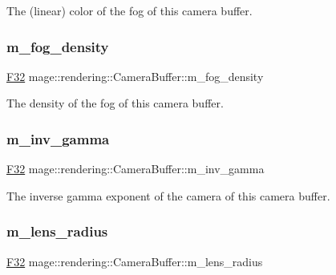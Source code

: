 The (linear) color of the fog of this camera buffer. \hypertarget{structmage_1_1rendering_1_1_camera_buffer_aa9c3a305adfbeb717d480e822ed1c77e}{}\label{structmage_1_1rendering_1_1_camera_buffer_aa9c3a305adfbeb717d480e822ed1c77e} 
\subsubsection{\texorpdfstring{m\+\_\+fog\+\_\+density}{m\_fog\_density}}
{\footnotesize\ttfamily \hyperlink{namespacemage_aa97e833b45f06d60a0a9c4fc22ae02c0}{F32} mage\+::rendering\+::\+Camera\+Buffer\+::m\+\_\+fog\+\_\+density}

The density of the fog of this camera buffer. \hypertarget{structmage_1_1rendering_1_1_camera_buffer_a0ff45fc9f243d43fa43952b026900ade}{}\label{structmage_1_1rendering_1_1_camera_buffer_a0ff45fc9f243d43fa43952b026900ade} 
\subsubsection{\texorpdfstring{m\+\_\+inv\+\_\+gamma}{m\_inv\_gamma}}
{\footnotesize\ttfamily \hyperlink{namespacemage_aa97e833b45f06d60a0a9c4fc22ae02c0}{F32} mage\+::rendering\+::\+Camera\+Buffer\+::m\+\_\+inv\+\_\+gamma}

The inverse gamma exponent of the camera of this camera buffer. \hypertarget{structmage_1_1rendering_1_1_camera_buffer_a7915bec843e03ad2248c08b10317ccc7}{}\label{structmage_1_1rendering_1_1_camera_buffer_a7915bec843e03ad2248c08b10317ccc7} 
\subsubsection{\texorpdfstring{m\+\_\+lens\+\_\+radius}{m\_lens\_radius}}
{\footnotesize\ttfamily \hyperlink{namespacemage_aa97e833b45f06d60a0a9c4fc22ae02c0}{F32} mage\+::rendering\+::\+Camera\+Buffer\+::m\+\_\+lens\+\_\+radius}

